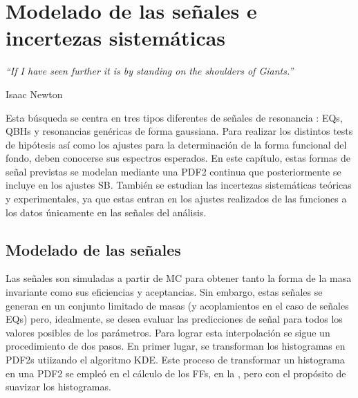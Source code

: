 \chapter{Modelado de las señales e incertezas sistemáticas}
\label{ch:signals}
\epigraph{\emph{``If I have seen further it is by standing on the shoulders of Giants.”}}{Isaac Newton}


Esta búsqueda se centra en tres tipos diferentes de señales de resonancia \gammajet: \acp{EQ}, \acp{QBH} y resonancias genéricas de forma gaussiana. Para realizar los distintos tests de hipótesis así como los ajustes para la determinación de la forma funcional del fondo, deben conocerse sus espectros \myj esperados.
En este capítulo, estas formas de señal previstas se modelan mediante una \ac{PDF2} continua que posteriormente se incluye en los ajustes \ac{SB}.
También se estudian las incertezas sistemáticas teóricas y experimentales, ya que estas entran en los ajustes realizados de las funciones a los datos \'unicamente en las señales del análisis.













\section{Modelado de las señales}
\label{sec:signals:modeling}

Las señales son simuladas a partir de \ac{MC} para obtener tanto la forma de la masa invariante como sus eficiencias y aceptancias. Sin embargo, estas señales se generan en un conjunto limitado de masas (y acoplamientos en el caso de señales \acp{EQ}) pero, idealmente, se desea evaluar las predicciones de señal para todos los valores posibles de los parámetros.
Para lograr esta interpolación se sigue un procedimiento de dos pasos. En primer lugar, se transforman los histogramas en \acp{PDF2} utiizando el algoritmo \ac{KDE}. Este proceso de transformar un histograma en una \ac{PDF2} se empleó en el cálculo de los \acp{FF}, en la \Sect{\ref{subsec:ss_corrections:ffs:calculation}}, pero con el propósito de suavizar los histogramas.



